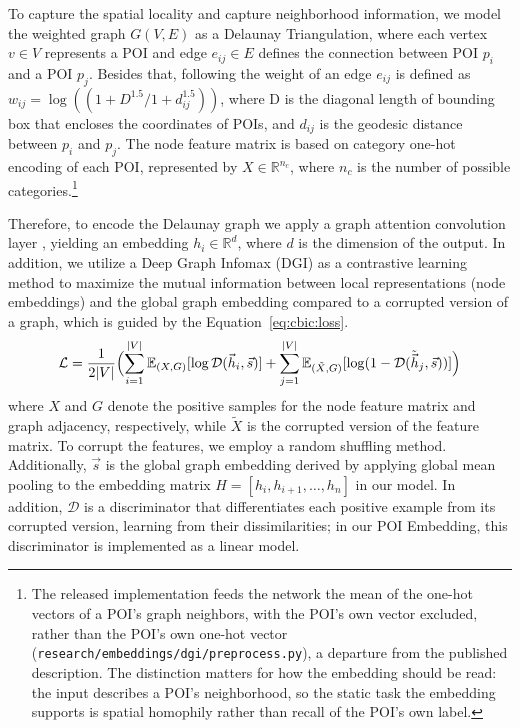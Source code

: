 To capture the spatial locality and capture neighborhood information, we model the weighted graph $G(V, E)$ as a Delaunay Triangulation, where each vertex $v \in V$ represents a POI and edge $e_{ij} \in E$ defines the connection between POI $p_i$ and a POI $p_j$. Besides that, following \cite{huang2022estimating} the weight of an edge $e_{ij}$ is defined as $w_{ij} = \log((1+D^{1.5}/1+d_{ij}^{1.5}))$, where D is the diagonal length of bounding box that encloses the coordinates of POIs, and $d_{ij}$ is the geodesic distance between $p_{i}$ and $p_{j}$. The node feature matrix is based on category one-hot encoding of each POI, represented by $X \in \mathbb{R}^{n_c}$, where $n_c$ is the number of possible categories.\footnote{The released implementation feeds the network the mean of the one-hot vectors of a POI's graph neighbors, with the POI's own vector excluded, rather than the POI's own one-hot vector (\texttt{research/embeddings/dgi/preprocess.py}), a departure from the published description. The distinction matters for how the embedding should be read: the input describes a POI's neighborhood, so the static task the embedding supports is spatial homophily rather than recall of the POI's own label.}

Therefore, to encode the Delaunay graph we apply a graph attention convolution layer \cite{velivckovic2017graph}, yielding an embedding $h_i \in \mathbb{R}^{d}$, where $d$ is the dimension of the output. In addition, we utilize a Deep Graph Infomax (DGI) \cite{velickovic2019deep} as a contrastive learning method to maximize the mutual information between local representations (node embeddings) and the global graph embedding compared to a corrupted version of a graph, which is guided by the Equation~\ref{eq:cbic:loss}.
\begin{equation}
  \mathcal{L}
  = \frac{1}{2|V|}\Bigl(
        \sum_{i=1}^{|V|}
          \mathbb{E}_{(X,G)}
          [\log \mathcal{D}(\vec{h}_i,\vec{s})]
        +
        \sum_{j=1}^{|V|}
          \mathbb{E}_{(\tilde{X}, G)}
          [\log (1-\mathcal{D}(\tilde{\vec{h}}_j,\vec{s}))]\Bigr)
  \label{eq:cbic:loss}
\end{equation}
where $X$ and $G$ denote the positive samples for the node feature matrix and graph adjacency, respectively, while $\tilde{X}$ is the corrupted version of the feature matrix. To corrupt the features, we employ a random shuffling method. Additionally, $\vec{s}$ is the global graph embedding derived by applying global mean pooling to the embedding matrix $H = [h_i, h_{i+1}, \ldots, h_{n}]$ in our model. In addition, $\mathcal{D}$ is a discriminator that differentiates each positive example from its corrupted version, learning from their dissimilarities; in our POI Embedding, this discriminator is implemented as a linear model.

